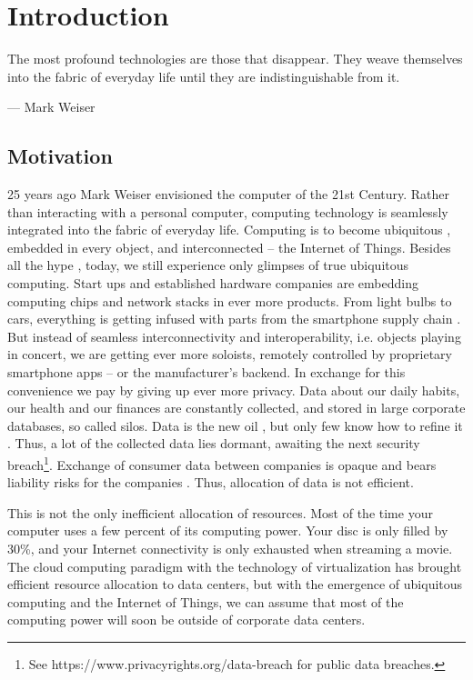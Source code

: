 \chapter{Introduction}
\label{sec:introduction}

\epigraph{The most profound technologies are those that disappear. They weave themselves into the
fabric of everyday life until they are indistinguishable from it.}{--- \textup{Mark Weiser}}

\section{Motivation}

25 years ago Mark Weiser envisioned the computer of the 21st Century. Rather than interacting with a personal computer, computing technology is seamlessly integrated into the fabric of everyday life. Computing is to become ubiquitous \parencite{weiser:13609162}, embedded in every object, and interconnected -- the Internet of Things.
Besides all the hype \parencite{Gartner:2015,manyika2015unlocking}, today, we still experience only glimpses of true ubiquitous computing. Start ups and established hardware companies are embedding computing chips and network stacks in ever more products. From light bulbs to cars, everything is getting infused with parts from the smartphone supply chain \parencite{Evans:2015,Evans:2016}. But instead of seamless interconnectivity and interoperability, i.e. objects playing in concert, we are getting ever more soloists, remotely controlled by proprietary smartphone apps -- or the manufacturer's backend. In exchange for this convenience we pay by giving up ever more privacy. Data about our daily habits, our health and our finances are constantly collected, and stored in large corporate databases, so called silos. Data is the new oil \parencite{schwab2011personal}, but only few know how to refine it \parencite{manyika2015unlocking}. Thus, a lot of the collected data lies dormant, awaiting the next security breach\footnote{See https://www.privacyrights.org/data-breach for public data breaches.}. Exchange of consumer data between companies is opaque and bears liability risks for the companies \parencite{ISI:000330253700010}. Thus, allocation of data is not efficient. 

This is not the only inefficient allocation of resources. Most of the time your computer uses a few percent of its computing power. Your disc is only filled by 30\%, and your Internet connectivity is only exhausted when streaming a movie. The cloud computing paradigm \parencite{Hayes:2008:CC:1364782.1364786,Armbrust:2010:VCC:1721654.1721672} with the technology of virtualization \parencite{barham2003xen} has brought efficient resource allocation to data centers, but with the emergence of ubiquitous computing and the Internet of Things, we can assume that most of the computing power will soon be outside of corporate data centers. 

